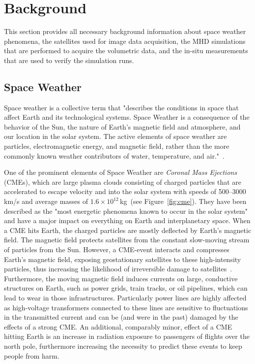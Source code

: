 \documentclass[journal]{vgtc}                %
\begin{document}
\section{Background}
This section provides all necessary background information about space weather phenomena, the satellites used for image data acquisition, the MHD simulations that are performed to acquire the volumetric data, and the in-situ measurements that are used to verify the simulation runs.

\subsection{Space Weather}
Space weather is a collective term that "describes the conditions in space that affect Earth and its technological systems. Space Weather is a consequence of the behavior of the Sun, the nature of Earth’s magnetic field and atmosphere, and our location in the solar system. The active elements of space weather are particles, electromagnetic energy, and magnetic field, rather than the more commonly known weather contributors of water, temperature, and air."~\cite{noaaprofile}.

One of the prominent elements of Space Weather are \emph{Coronal Mass Ejections} (CMEs), which are large plasma clouds consisting of charged particles that are accelerated to escape velocity and into the solar system with speeds of 500--3000 km/s and average masses of $1.6 \times 10^{12}$\,kg~(see Figure~\ref{fig:cme}). They have been described as the "most energetic phenomena known to occur in the solar system"~\cite{Kahler:1987jt} and have a major impact on everything on Earth and interplanetary space. When a CME hits Earth, the charged particles are mostly deflected by Earth's magnetic field. The magnetic field protects satellites from the constant slow-moving stream of particles from the Sun. However, a CME-event interacts and compresses Earth's magnetic field, exposing geostationary satellites to these high-intensity particles, thus increasing the likelihood of irreversible damage to satellites~\cite{Guhathakurta:2013cl}. Furthermore, the moving magnetic field induces currents on large, conductive structures on Earth, such as power grids, train tracks, or oil pipelines, which can lead to wear in those infrastructures. Particularly power lines are highly affected as high-voltage transformers connected to these lines are sensitive to fluctuations in the transmitted current and can be (and were in the past) damaged by the effects of a strong CME. An additional, comparably minor, effect of a CME hitting Earth is an increase in radiation exposure to passengers of flights over the north pole, furthermore increasing the necessity to predict these events to keep people from harm.
\end{document}
